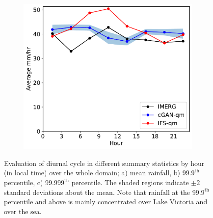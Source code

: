 \documentclass[../main.tex]{subfiles}
\begin{document}
\begin{figure}[t]
     \begin{subfigure}[t]{0.32\textwidth}
     \includegraphics[width=\textwidth]{images/diurnal_cycle_quantile_99999_final-nologs_217600.pdf}
     \caption{}
     \end{subfigure}
     \caption{Evaluation of diurnal cycle in different summary statistics by hour (in local time) over the whole domain; a) mean rainfall, b) $99.9^{\text{th}}$ percentile, c) $99.999^{\text{th}}$ percentile. The shaded regions indicate $\pm2$ standard deviations about the mean. Note that rainfall at the $99.9^{\text{th}}$ percentile and above is mainly concentrated over Lake Victoria and over the sea.}
     \label{fig:diurnal}
\end{figure}
\end{document}
